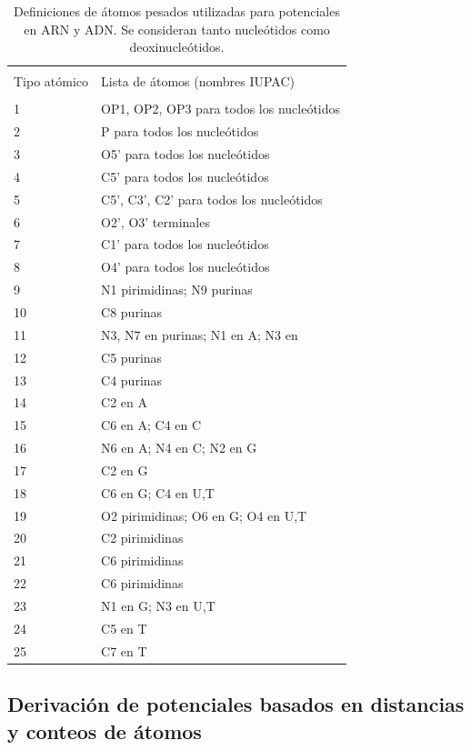 \newpage
\cleardoublepage
\begin{table}[!htp]
\begin{tabular}{p{40pt} p{380pt}}
  \hline \\
  Tipo atómico & Lista de átomos (nombres IUPAC) \\
  \hline \\
  1 & OP1, OP2, OP3 para todos los nucleótidos \\
  2 & P para todos los nucleótidos \\
  3 & O5' para todos los nucleótidos \\
  4 & C5' para todos los nucleótidos \\
  5 & C5', C3', C2' para todos los nucleótidos \\
  6 & O2', O3' terminales \\
  7 & C1' para todos los nucleótidos \\
  8 & O4' para todos los nucleótidos \\
  9 & N1 pirimidinas; N9 purinas \\
 10 & C8 purinas \\
 11 & N3, N7 en purinas; N1 en A; N3 en \\
 12 & C5 purinas \\
 13 & C4 purinas \\
 14 & C2 en A \\
 15 & C6 en A; C4 en C \\
 16 & N6 en A; N4 en C; N2 en G \\
 17 & C2 en G \\
 18 & C6 en G; C4 en U,T \\
 19 & O2 pirimidinas; O6 en G; O4 en U,T \\
 20 & C2 pirimidinas \\
 21 & C6 pirimidinas \\
 22 & C6 pirimidinas \\
 23 & N1 en G; N3 en U,T \\
 24 & C5 en T \\
 25 & C7 en T \\
 \hline
\end{tabular}
\caption[Definiciones de átomos para ADN y ARN]{Definiciones de átomos pesados utilizadas para potenciales en ARN y ADN. 
Se consideran tanto nucleótidos como deoxinucleótidos.}
\label{table:atomnadef}
\end{table}
\newpage
\clearpage
\subsection{Derivación de potenciales basados en distancias y conteos de átomos}
